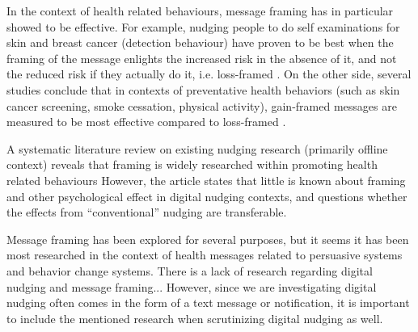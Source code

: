 In the context of health related behaviours, message framing has in particular showed to be effective. For example, nudging people to do self examinations for skin and breast cancer (detection behaviour) have proven to be best when the framing of the message enlights the increased risk in the absence of it, and not the reduced risk if they actually do it, i.e. loss-framed \cite{thaler_nudge-_2009}.
On the other side, several studies conclude that in contexts of preventative health behaviors (such as skin cancer screening, smoke cessation, physical activity), gain-framed messages are measured to be most effective compared to loss-framed \cite{gallagher_health_2012}.

A systematic literature review on existing nudging research (primarily offline context) reveals that framing is widely researched within promoting health related behaviours
\cite{mirsch_digital_2017}
However, the article states that little is known about framing and other psychological effect in digital nudging contexts, and questions whether the effects from “conventional” nudging are transferable. 

Message framing has been explored for several purposes, but it seems it has been most researched in the context of health messages related to persuasive systems and behavior change systems. There is a lack of research regarding digital nudging and message framing... However, since we are investigating digital nudging often comes in the form of a text message or notification, it is important to include the mentioned research when scrutinizing digital nudging as well. 

